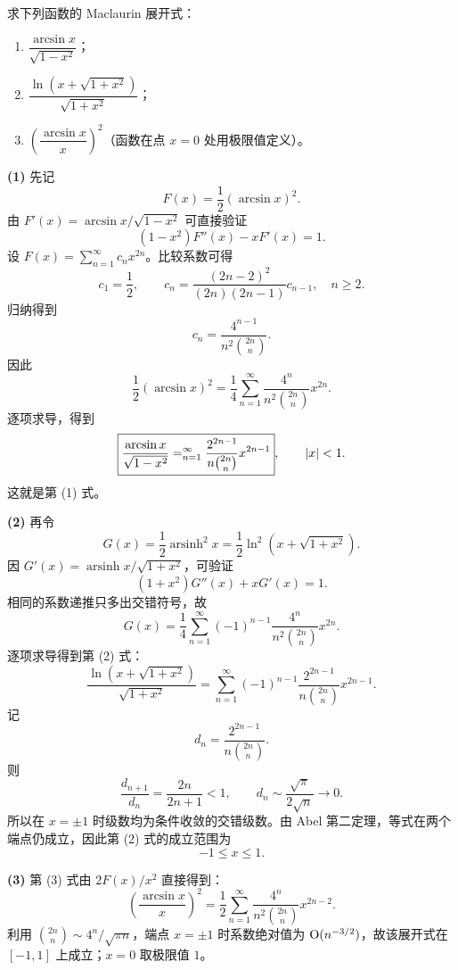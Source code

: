 \begin{xreferenceproblem}[8]
求下列函数的 Maclaurin 展开式：
  \begin{enumerate}[label=(\arabic*)]
    \item $\dfrac{\arcsin x}{\sqrt{1-x^2}}$；
    \item $\dfrac{\ln(x+\sqrt{1+x^2})}{\sqrt{1+x^2}}$；
    \item $\left(\dfrac{\arcsin x}{x}\right)^2$（函数在点 $x=0$ 处用极限值定义）。
  \end{enumerate}
\end{xreferenceproblem}
\begin{xsolution}
\textbf{(1)} 先记
\[
  F(x)=\frac12(\arcsin x)^2.
\]
由 $F'(x)=\arcsin x/\sqrt{1-x^2}$ 可直接验证
\[
  (1-x^2)F''(x)-xF'(x)=1.
\]
设 $F(x)=\sum_{n=1}^{\infty}c_nx^{2n}$。比较系数可得
\[
  c_1=\frac12,
  \qquad
  c_n=\frac{(2n-2)^2}{(2n)(2n-1)}c_{n-1},\quad n\geqslant2.
\]
归纳得到
\[
  c_n=\frac{4^{n-1}}{n^2{2n\choose n}}.
\]
因此
\[
  \frac12(\arcsin x)^2
  =\frac14\sum_{n=1}^{\infty}
  \frac{4^n}{n^2{2n\choose n}}x^{2n}.
\]
逐项求导，得到
\[
  \boxed{
  \frac{\arcsin x}{\sqrt{1-x^2}}
  =\relax_{n=1}^{\infty}
  \frac{2^{2n-1}}{n{2n\choose n}}x^{2n-1}},
  \qquad \lvert x\rvert<1.
\]
这就是第 (1) 式。

\textbf{(2)} 再令
\[
  G(x)=\frac12\operatorname{arsinh}^2x
  =\frac12\ln^2(x+\sqrt{1+x^2}).
\]
因 $G'(x)=\operatorname{arsinh}x/\sqrt{1+x^2}$，可验证
\[
  (1+x^2)G''(x)+xG'(x)=1.
\]
相同的系数递推只多出交错符号，故
\[
  G(x)=\frac14\sum_{n=1}^{\infty}
  (-1)^{n-1}\frac{4^n}{n^2{2n\choose n}}x^{2n}.
\]
逐项求导得到第 (2) 式：
\[
  \boxed{
  \frac{\ln(x+\sqrt{1+x^2})}{\sqrt{1+x^2}}
  =\sum_{n=1}^{\infty}
  (-1)^{n-1}\frac{2^{2n-1}}{n{2n\choose n}}x^{2n-1}}.
\]
记
\[
  d_n=\frac{2^{2n-1}}{n{2n\choose n}}.
\]
则
\[
  \frac{d_{n+1}}{d_n}=\frac{2n}{2n+1}<1,
  \qquad d_n\sim\frac{\sqrt\pi}{2\sqrt n}\to0.
\]
所以在 $x=\pm1$ 时级数均为条件收敛的交错级数。由 Abel 第二定理，等式在两个端点仍成立，因此第 (2) 式的成立范围为
\[
  \boxed{-1\leqslant x\leqslant1}.
\]

\textbf{(3)} 第 (3) 式由 $2F(x)/x^2$ 直接得到：
\[
  \boxed{
  \left(\frac{\arcsin x}{x}\right)^2
  =\frac12\sum_{n=1}^{\infty}
  \frac{4^n}{n^2{2n\choose n}}x^{2n-2}}.
\]
利用 ${2n\choose n}\sim4^n/\sqrt{\pi n}$，端点 $x=\pm1$ 时系数绝对值为 $\mathrm{O}(n^{-3/2})$，故该展开式在 $[-1,1]$ 上成立；$x=0$ 取极限值 $1$。
\end{xsolution}



